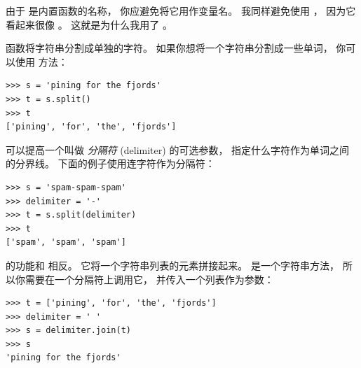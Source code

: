 %

由于  是内置函数的名称， 你应避免将它用作变量名。  我同样避免使用  ， 因为它看起来很像 。  这就是为什么我用了  。


 函数将字符串分割成单独的字符。  如果你想将一个字符串分割成一些单词， 你可以使用  方法：

  

\begin{lstlisting}
>>> s = 'pining for the fjords'
>>> t = s.split()
>>> t
['pining', 'for', 'the', 'fjords']
\end{lstlisting}

%

可以提高一个叫做 {\em 分隔符} (delimiter) 的可选参数， 指定什么字符作为单词之间的分界线。  下面的例子使用连字符作为分隔符：

  

\begin{lstlisting}
>>> s = 'spam-spam-spam'
>>> delimiter = '-'
>>> t = s.split(delimiter)
>>> t
['spam', 'spam', 'spam']
\end{lstlisting}

%

 的功能和  相反。  它将一个字符串列表的元素拼接起来。   是一个字符串方法， 所以你需要在一个分隔符上调用它， 并传入一个列表作为参数：

  

\begin{lstlisting}
>>> t = ['pining', 'for', 'the', 'fjords']
>>> delimiter = ' '
>>> s = delimiter.join(t)
>>> s
'pining for the fjords'
\end{lstlisting}

